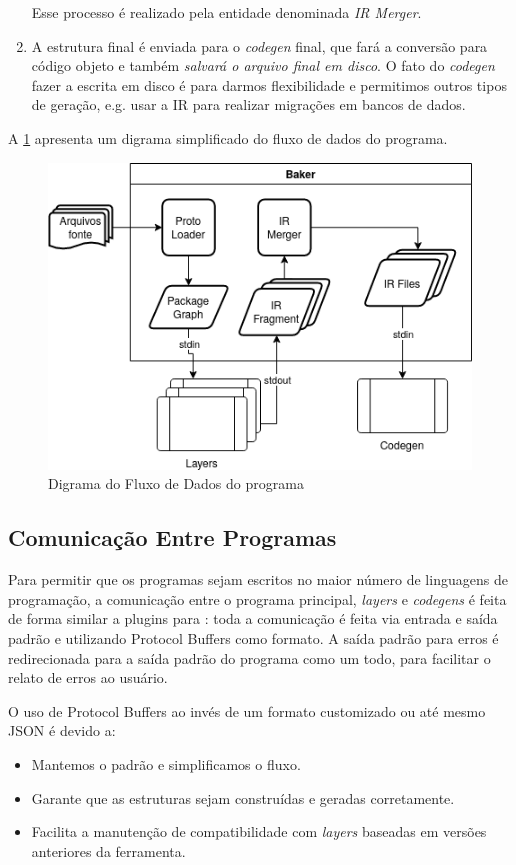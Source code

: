 \begin{enumerate}
  Esse processo é realizado pela entidade denominada \textit{IR Merger}.
\item A estrutura final é enviada para o \textit{codegen} final, que fará a conversão para código
  objeto e também \textit{salvará o arquivo final em disco}. O fato do \textit{codegen} fazer a
  escrita em disco é para darmos flexibilidade e permitimos outros tipos de geração, e.g. usar
  a IR para realizar migrações em bancos de dados.
\end{enumerate}

A \cref{fig:baker-data-flow} apresenta um digrama simplificado do fluxo de dados do programa.

\begin{figure}[h]
  \centering
  \includegraphics[width=0.8\linewidth]{Imagens/baker-diagram.png}
  \caption{Digrama do Fluxo de Dados do programa}
  \label{fig:baker-data-flow}
\end{figure}

\subsection{Comunicação Entre Programas}

Para permitir que os programas sejam escritos no maior número de linguagens de programação, a comunicação
entre o programa principal, \textit{layers} e \textit{codegens} é feita de forma similar a plugins para
\cite{googl:protobuf}: toda a comunicação é feita via entrada e saída padrão e utilizando Protocol Buffers
como formato. A saída padrão para erros é redirecionada para a saída padrão do programa como um todo, para
facilitar o relato de erros ao usuário.

O uso de Protocol Buffers ao invés de um formato customizado ou até mesmo JSON é devido a:

\begin{itemize}
\item Mantemos o padrão e simplificamos o fluxo.
\item Garante que as estruturas sejam construídas e geradas corretamente.
\item Facilita a manutenção de compatibilidade com \textit{layers} baseadas em versões anteriores
  da ferramenta.
\end{itemize}
